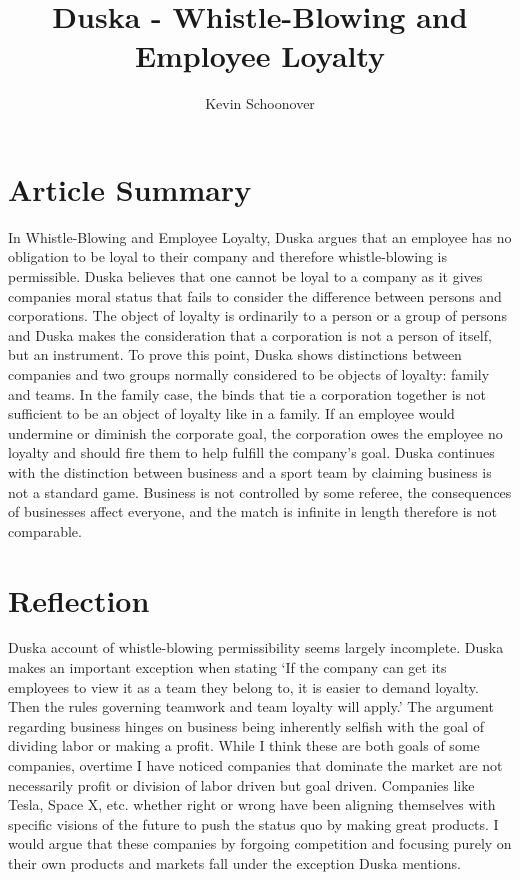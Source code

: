 \documentclass[12pt]{article}
\begin{document}
\title{Duska - Whistle-Blowing and Employee Loyalty}
\author{Kevin Schoonover}

\maketitle

\section{Article Summary}
In Whistle-Blowing and Employee Loyalty, Duska argues that an employee has no
obligation to be loyal to their company and therefore whistle-blowing is
permissible. Duska believes that one cannot be loyal to a company as it gives
companies moral status that fails to consider the difference between persons and
corporations. The object of loyalty is ordinarily to a person or a group of
persons and Duska makes the consideration that a corporation is not a person of
itself, but an instrument. To prove this point, Duska shows distinctions
between companies and two groups normally considered to be objects of loyalty:
family and teams. In the family case, the binds that tie a corporation together
is not sufficient to be an object of loyalty like in a family. If an employee
would undermine or diminish the corporate goal, the corporation owes the
employee no loyalty and should fire them to help fulfill the company's goal.
Duska continues with the distinction between business and a sport team by
claiming business is not a standard game.  Business is not controlled by some
referee, the consequences of businesses affect everyone, and the match is
infinite in length therefore is not comparable.

\section{Reflection}
Duska account of whistle-blowing permissibility seems largely incomplete. Duska
makes an important exception when stating `If the company can get its employees
to view it as a team they belong to, it is easier to demand loyalty. Then the
rules governing teamwork and team loyalty will apply.' The argument regarding
business hinges on business being inherently selfish with the goal of dividing
labor or making a profit. While I think these are both goals of some companies,
overtime I have noticed companies that dominate the market are not necessarily
profit or division of labor driven but goal driven. Companies like Tesla, Space
X, etc. whether right or wrong have been aligning themselves with specific
visions of the future to push the status quo by making great products. I would
argue that these companies by forgoing competition and focusing purely on their
own products and markets fall under the exception Duska mentions.
\end{document}
